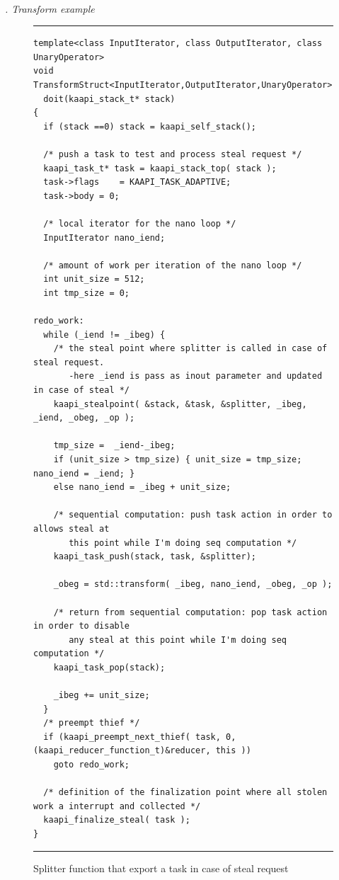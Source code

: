 \documentclass[12pt]{report}
\renewcommand{\subsubsection}[1]{~\\ \addtocounter{subsubsection}{1} \noindent\textit{
\thesubsubsection. #1\\}}
\begin{document}
\newpage 
\subsubsection{Transform example}

\begin{figure}[h!]
\hrule
\vspace*{1ex}
\small
\begin{verbatim}
template<class InputIterator, class OutputIterator, class UnaryOperator>
void TransformStruct<InputIterator,OutputIterator,UnaryOperator>::
  doit(kaapi_stack_t* stack)
{
  if (stack ==0) stack = kaapi_self_stack();
  
  /* push a task to test and process steal request */
  kaapi_task_t* task = kaapi_stack_top( stack );
  task->flags    = KAAPI_TASK_ADAPTIVE;
  task->body = 0;

  /* local iterator for the nano loop */
  InputIterator nano_iend;
  
  /* amount of work per iteration of the nano loop */
  int unit_size = 512;
  int tmp_size = 0;

redo_work:
  while (_iend != _ibeg) {
    /* the steal point where splitter is called in case of steal request.
       -here _iend is pass as inout parameter and updated in case of steal */
    kaapi_stealpoint( &stack, &task, &splitter, _ibeg, _iend, _obeg, _op );

    tmp_size =  _iend-_ibeg;
    if (unit_size > tmp_size) { unit_size = tmp_size; nano_iend = _iend; }
    else nano_iend = _ibeg + unit_size;
    
    /* sequential computation: push task action in order to allows steal at 
       this point while I'm doing seq computation */
    kaapi_task_push(stack, task, &splitter);
    
    _obeg = std::transform( _ibeg, nano_iend, _obeg, _op );

    /* return from sequential computation: pop task action in order to disable 
       any steal at this point while I'm doing seq computation */
    kaapi_task_pop(stack);

    _ibeg += unit_size;
  }
  /* preempt thief */
  if (kaapi_preempt_next_thief( task, 0, (kaapi_reducer_function_t)&reducer, this )) 
    goto redo_work;

  /* definition of the finalization point where all stolen work a interrupt and collected */
  kaapi_finalize_steal( task );
}
\end{verbatim}
\vspace*{-3ex}
\caption{Splitter function that export a task in case of steal request}
\label{fig:splitterfiboadapt}
\vspace*{1ex}
\hrule
\end{figure}
\end{document}
